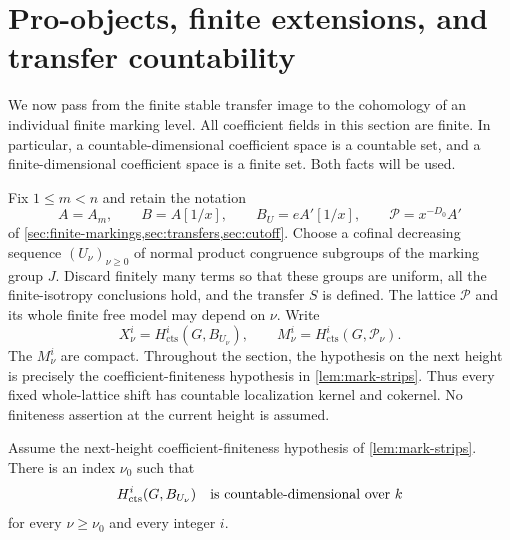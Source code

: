 \section{Pro-objects, finite extensions, and transfer countability}
\label{sec:pro-transfer}

We now pass from the finite stable transfer image to the cohomology of an
individual finite marking level.  All coefficient fields in this section
are finite.  In particular, a countable-dimensional coefficient space is
a countable set, and a finite-dimensional coefficient space is a finite
set.  Both facts will be used.

Fix $1\leq m<n$ and retain the notation
\[
 A=A_m,\qquad B=A[1/x],\qquad B_U=eA'[1/x],\qquad
 \mathcal P=x^{-D_0}A'
\]
of \cref{sec:finite-markings,sec:transfers,sec:cutoff}.
Choose a cofinal decreasing sequence $(U_\nu)_{\nu\geq0}$ of normal
product congruence subgroups of the marking group $J$.  Discard finitely
many terms so that these groups are uniform, all the finite-isotropy
conclusions hold, and the transfer $S$ is defined.  The lattice
$\mathcal P$ and its whole finite free model may depend on $\nu$.
Write
\[
 X^i_\nu=H^i_{\mathrm{cts}}(G,B_{U_\nu}),\qquad
 M^i_\nu=H^i_{\mathrm{cts}}(G,\mathcal P_\nu).
\]
The $M^i_\nu$ are compact.  Throughout the section, the hypothesis on
the next height is precisely the coefficient-finiteness hypothesis in
\cref{lem:mark-strips}.  Thus every fixed whole-lattice shift has
countable localization kernel and cokernel.  No finiteness assertion at
the current height is assumed.

\begin{theorem}
\label{thm:pro-countability}
Assume the next-height coefficient-finiteness hypothesis of
\cref{lem:mark-strips}.  There is an index $\nu_0$ such that
\[
 H^i_{\mathrm{cts}}(G,B_{U_\nu})
 \quad\text{is countable-dimensional over $k$}
\]
for every $\nu\geq\nu_0$ and every integer $i$.
\end{theorem}

